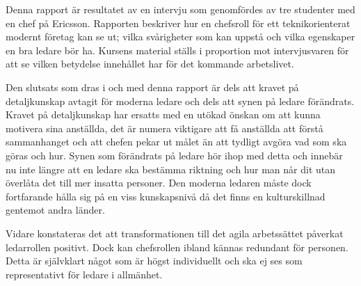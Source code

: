 
Denna rapport är resultatet av en intervju som genomfördes av tre studenter med en chef på Ericsson. Rapporten beskriver hur en chefsroll för ett teknikorienterat modernt företag kan se ut; vilka svårigheter som kan uppstå och vilka egenskaper en bra ledare bör ha. Kursens material ställs i proportion mot intervjusvaren för att se vilken betydelse innehållet har för det kommande arbetslivet.

Den slutsats som dras i och med denna rapport är dels att kravet på detaljkunskap avtagit för moderna ledare och dels att synen på ledare förändrats. Kravet på detaljkunskap har ersatts med en utökad önskan om att kunna motivera sina anställda, det är numera viktigare att få anställda att förstå sammanhanget och att chefen pekar ut målet än att tydligt avgöra vad som ska göras och hur. Synen som förändrats på ledare hör ihop med detta och innebär nu inte längre att en ledare ska bestämma riktning och hur man når dit utan överlåta det till mer insatta personer. Den moderna ledaren måste dock fortfarande hålla sig på en viss kunskapsnivå då det finns en kulturskillnad gentemot andra länder.

Vidare konstateras det att transformationen till det agila arbetssättet påverkat ledarrollen positivt. Dock kan chefsrollen ibland kännas redundant för personen. Detta är självklart något som är högst individuellt och ska ej ses som representativt för ledare i allmänhet.